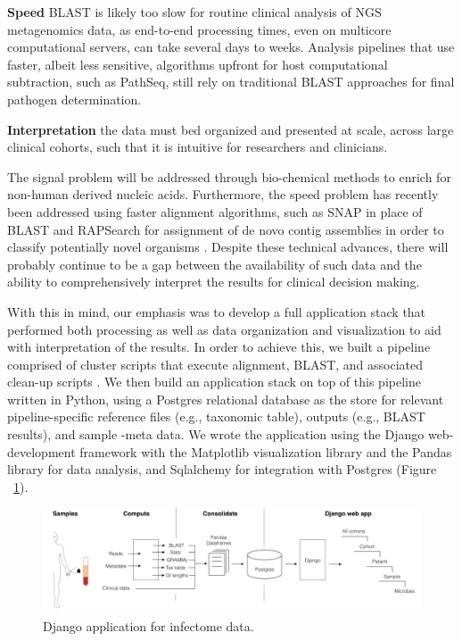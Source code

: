 \textbf{Speed} BLAST is likely too slow for routine clinical analysis of NGS metagenomics data, as end-to-end processing times, even on multicore computational servers, can take several days to weeks.  Analysis pipelines that use faster, albeit less sensitive, algorithms upfront for host computational subtraction, such as PathSeq, still rely on traditional BLAST approaches for final pathogen determination.  

\textbf{Interpretation} the data must bed organized and presented at scale, across large clinical cohorts, such that it is intuitive for researchers and clinicians.

The signal problem will be addressed through bio-chemical methods to enrich for non-human derived nucleic acids. Furthermore, the speed problem has recently been addressed using faster alignment algorithms, such as SNAP in place of BLAST and RAPSearch for assignment of de novo contig assemblies in order to classify potentially novel organisms \cite{Naccache:2014gk}. Despite these technical advances, there will probably continue to be a gap between the availability of such data and the ability to comprehensively interpret the results for clinical decision making. 

With this in mind, our emphasis was to develop a full application stack that performed both processing as well as data organization and visualization to aid with interpretation of the results. In order to achieve this, we built a pipeline comprised of cluster scripts that execute alignment, BLAST, and associated clean-up scripts \cite{Xia:2011it}. We then build an application stack on top of this pipeline written in Python, using a Postgres relational database as the store for relevant pipeline-specific reference files (e.g., taxonomic table), outputs (e.g., BLAST results), and sample -meta data. We wrote the application using the Django web-development framework with the Matplotlib visualization library \cite{Hunter:2007ux} and the Pandas library for data analysis, and Sqlalchemy for integration with Postgres (Figure ~\ref{fig:Fig4}).

\begin{figure}
\center\includegraphics[width=150mm,scale=0.5]{Figures/Fig4}
\caption{Django application for infectome data.}
\label{fig:Fig4}
\end{figure}

